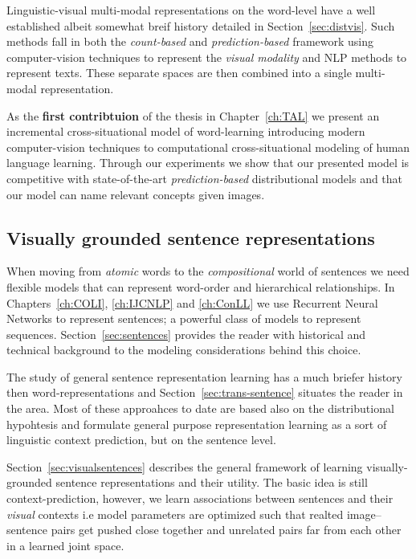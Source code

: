 Linguistic-visual multi-modal representations on the word-level have a well established albeit somewhat breif history 
detailed in Section~\ref{sec:distvis}. Such methods fall in both the \emph{count-based}
and \emph{prediction-based} framework using computer-vision techniques to represent the \emph{visual
modality} and NLP methods to represent texts. These separate spaces are then combined into a single multi-modal representation.

As the \textbf{first contribtuion} of the thesis in Chapter~\ref{ch:TAL} we present an incremental cross-situational
model of word-learning introducing modern computer-vision techniques to computational cross-situational modeling of 
human language learning. Through our experiments we show that our presented model is competitive with state-of-the-art
\emph{prediction-based} distributional models and that our model can name relevant concepts given images.

\subsection{Visually grounded sentence representations}

When moving from \emph{atomic} words to the \emph{compositional} world of sentences we need flexible
models that can represent word-order and hierarchical relationships.  In Chapters~\ref{ch:COLI}, \ref{ch:IJCNLP} and \ref{ch:ConLL} 
we use Recurrent Neural Networks to represent sentences; a powerful class of models to represent sequences.
Section~\ref{sec:sentences} provides the reader with 
historical and technical background to the modeling considerations behind this choice.

The study of general sentence representation learning has a much briefer history then word-representations
and Section~\ref{sec:trans-sentence} situates the reader in the area. Most of these approahces to date are 
based also on the distributional hypohtesis and formulate general purpose representation learning as a sort of
linguistic context prediction, but on the sentence level. 

Section~\ref{sec:visualsentences}
describes the general framework of learning visually-grounded sentence representations and their utility. 
The basic idea is still context-prediction, however, we learn associations between sentences and their \emph{visual} 
contexts i.e model parameters are optimized such that realted image--sentence pairs get pushed close together and 
unrelated pairs far from each other in a learned joint space.

